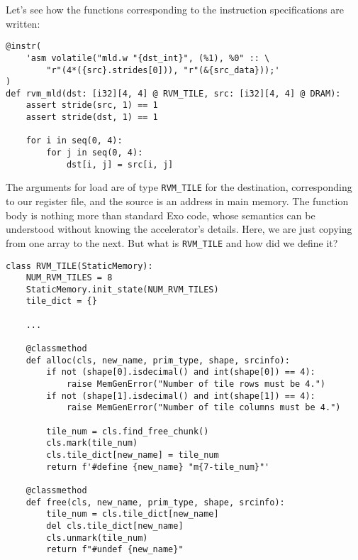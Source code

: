 \documentclass[acmsmall, nonacm=true]{acmart}
\begin{document}
Let's see how the functions corresponding to the instruction specifications are written:

\begin{verbatim}
@instr(
    'asm volatile("mld.w "{dst_int}", (%1), %0" :: \
        "r"(4*({src}.strides[0])), "r"(&{src_data}));'
)
def rvm_mld(dst: [i32][4, 4] @ RVM_TILE, src: [i32][4, 4] @ DRAM):
    assert stride(src, 1) == 1
    assert stride(dst, 1) == 1

    for i in seq(0, 4):
        for j in seq(0, 4):
            dst[i, j] = src[i, j]
\end{verbatim}

The arguments for load are of type \verb|RVM_TILE| for the destination, corresponding to our register file, and the source is an address in main memory. The function body is nothing more than standard Exo code, whose semantics can be understood without knowing the accelerator's details. Here, we are just copying from one array to the next. But what is \verb|RVM_TILE| and how did we define it? 

\begin{verbatim}
class RVM_TILE(StaticMemory):
    NUM_RVM_TILES = 8
    StaticMemory.init_state(NUM_RVM_TILES)
    tile_dict = {}

    ... 

    @classmethod
    def alloc(cls, new_name, prim_type, shape, srcinfo):
        if not (shape[0].isdecimal() and int(shape[0]) == 4):
            raise MemGenError("Number of tile rows must be 4.")
        if not (shape[1].isdecimal() and int(shape[1]) == 4):
            raise MemGenError("Number of tile columns must be 4.")

        tile_num = cls.find_free_chunk()
        cls.mark(tile_num)
        cls.tile_dict[new_name] = tile_num
        return f'#define {new_name} "m{7-tile_num}"'

    @classmethod
    def free(cls, new_name, prim_type, shape, srcinfo):
        tile_num = cls.tile_dict[new_name]
        del cls.tile_dict[new_name]
        cls.unmark(tile_num)
        return f"#undef {new_name}"

\end{verbatim}
\end{document}
